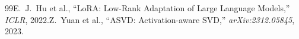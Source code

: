 \begin{thebibliography}{99}E.~J.~Hu et al., ``LoRA: Low-Rank Adaptation of Large Language Models,'' \emph{ICLR}, 2022.Z.~Yuan et al., ``ASVD: Activation-aware SVD,'' \emph{arXiv:2312.05845}, 2023.\end{thebibliography}
